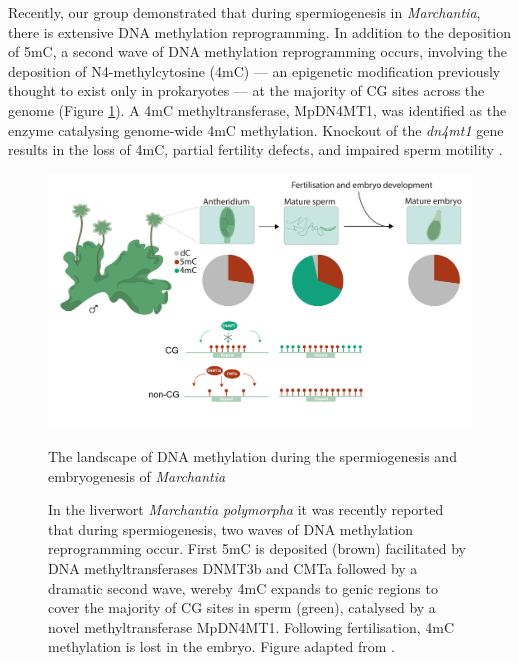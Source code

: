Recently, our group demonstrated that during spermiogenesis in \textit{Marchantia}, there is extensive DNA methylation reprogramming. In addition to the deposition of 5mC, a second wave of DNA methylation reprogramming occurs, involving the deposition of N4-methylcytosine (4mC) — an epigenetic modification previously thought to exist only in prokaryotes — at the majority of CG sites across the genome (Figure \ref{fig:Mp_graphical_abstract}). A 4mC methyltransferase, MpDN4MT1, was identified as the enzyme catalysing genome-wide 4mC methylation. Knockout of the \textit{dn4mt1} gene results in the loss of 4mC, partial fertility defects, and impaired sperm motility \cite{RN189}.

\begin{figure}[htbp!] 
\centering    
    \includegraphics[width=1\textwidth]{Chapter3/Figs/Intro/Graphical_abstract.pdf}
\caption{The landscape of DNA methylation during the spermiogenesis and embryogenesis of \textit{Marchantia}}
\label{fig:Mp_graphical_abstract}
\captionsetup{font=small}
    \caption*{In the liverwort \textit{Marchantia polymorpha }it was recently reported \cite{RN189} that during spermiogenesis, two waves of DNA methylation reprogramming occur. First 5mC is deposited (brown) facilitated by DNA methyltransferases DNMT3b and CMTa followed by a dramatic second wave, wereby 4mC expands to genic regions to cover the majority of CG sites in sperm (green), catalysed by a novel methyltransferase MpDN4MT1. Following fertilisation,  4mC methylation is lost in the embryo. Figure adapted from \cite{RN189}.}
\end{figure}

